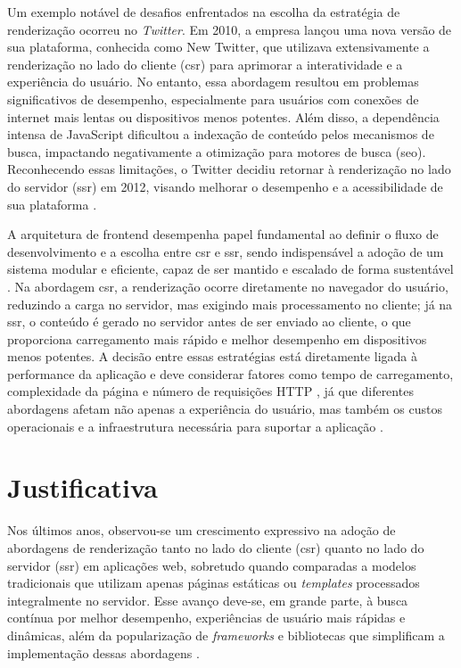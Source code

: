 Um exemplo notável de desafios enfrentados na escolha da estratégia de renderização ocorreu no \emph{Twitter}. Em 2010, a empresa lançou uma nova versão de sua plataforma, conhecida como New Twitter, que utilizava extensivamente a renderização no lado do cliente (\acrshort{csr}) para aprimorar a interatividade e a experiência do usuário. No entanto, essa abordagem resultou em problemas significativos de desempenho, especialmente para usuários com conexões de internet mais lentas ou dispositivos menos potentes. Além disso, a dependência intensa de JavaScript dificultou a indexação de conteúdo pelos mecanismos de busca, impactando negativamente a otimização para motores de busca (\acrshort{seo}). Reconhecendo essas limitações, o Twitter decidiu retornar à renderização no lado do servidor (\acrshort{ssr}) em 2012, visando melhorar o desempenho e a acessibilidade de sua plataforma \cite{twitter}.

A arquitetura de frontend desempenha papel fundamental ao definir o fluxo de desenvolvimento e a escolha entre \acrshort{csr} e \acrshort{ssr}, sendo indispensável a adoção de um sistema modular e eficiente, capaz de ser mantido e escalado de forma sustentável \cite{frontendGodbolt}. Na abordagem \acrshort{csr}, a renderização ocorre diretamente no navegador do usuário, reduzindo a carga no servidor, mas exigindo mais processamento no cliente; já na \acrshort{ssr}, o conteúdo é gerado no servidor antes de ser enviado ao cliente, o que proporciona carregamento mais rápido e melhor desempenho em dispositivos menos potentes. A decisão entre essas estratégias está diretamente ligada à performance da aplicação e deve considerar fatores como tempo de carregamento, complexidade da página e número de requisições HTTP , já que diferentes abordagens afetam não apenas a experiência do usuário, mas também os custos operacionais e a infraestrutura necessária para suportar a aplicação \cite{webPerformance}.

\section{Justificativa}

Nos últimos anos, observou-se um crescimento expressivo na adoção de abordagens de renderização tanto no lado do cliente (\acrshort{csr}) quanto no lado do servidor (\acrshort{ssr}) em aplicações web, sobretudo quando comparadas a modelos tradicionais que utilizam apenas páginas estáticas ou \emph{templates} processados integralmente no servidor. Esse avanço deve-se, em grande parte, à busca contínua por melhor desempenho, experiências de usuário mais rápidas e dinâmicas, além da popularização de \emph{frameworks} e bibliotecas que simplificam a implementação dessas abordagens \cite{atori2024}.

